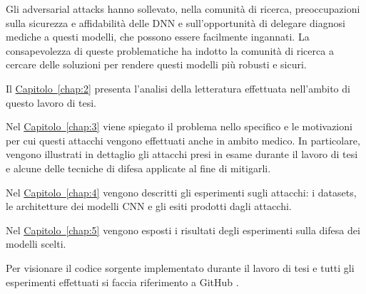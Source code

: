 Gli adversarial attacks hanno sollevato, nella comunità di ricerca, preoccupazioni sulla sicurezza e affidabilità delle DNN e sull'opportunità di delegare diagnosi mediche a questi modelli, che possono essere facilmente ingannati. 
La consapevolezza di queste problematiche ha indotto la comunità di ricerca a cercare delle soluzioni per rendere questi modelli più robusti e sicuri.

\bigskip
Il \hyperref[chap:2]{Capitolo~\ref*{chap:2}} presenta l'analisi della letteratura effettuata nell'ambito di questo lavoro di tesi.

\bigskip
Nel \hyperref[chap:3]{Capitolo~\ref*{chap:3}} viene spiegato il problema nello specifico e le motivazioni per cui questi attacchi vengono effettuati anche in ambito medico. In particolare, vengono illustrati in dettaglio gli attacchi presi in esame durante il lavoro di tesi e alcune delle tecniche di difesa applicate al fine di mitigarli. 

\bigskip
Nel \hyperref[chap:4]{Capitolo~\ref*{chap:4}} vengono descritti gli esperimenti sugli attacchi: i datasets, le architetture dei modelli CNN e gli esiti prodotti dagli attacchi.

\bigskip
Nel \hyperref[chap:5]{Capitolo~\ref*{chap:5}} vengono esposti i risultati degli esperimenti sulla difesa dei modelli scelti.

\bigskip
Per visionare il codice sorgente implementato durante il lavoro di tesi e tutti gli esperimenti effettuati si faccia riferimento a GitHub \cite{MyGitHub}.